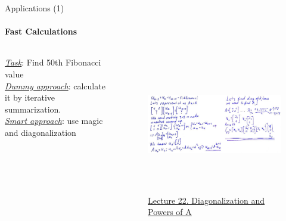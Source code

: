 \documentclass[aspectratio=169]{beamer}
\begin{document}
\begin{frame}[t]{Applications (1)}
    \framesubtitle{Fast Calculations}
            \begin{columns}[T,onlytextwidth]
                \begin{column}{0.3\textwidth}
                    \underline{\textit{Task}}: Find 50th Fibonacci value \\
\textit{\underline{Dummy approach}}: calculate it by iterative summarization. \\
\underline{\textit{Smart approach}}: use magic and diagonalization \\ 
                \end{column}
                \begin{column}{0.69\textwidth}
                    \begin{figure}[H]
                        \centering\includegraphics[height=6cm,width=1\textwidth,keepaspectratio]{fibo.jpg}
                        \caption*{ \Large \href{https://youtu.be/13r9QY6cmjc?t=2072}{Lecture 22. Diagonalization and Powers of A}}
                        \label{fig:fibo.jpg}
                    \end{figure}
                \end{column}
            \end{columns}
\end{frame}
\end{document}
